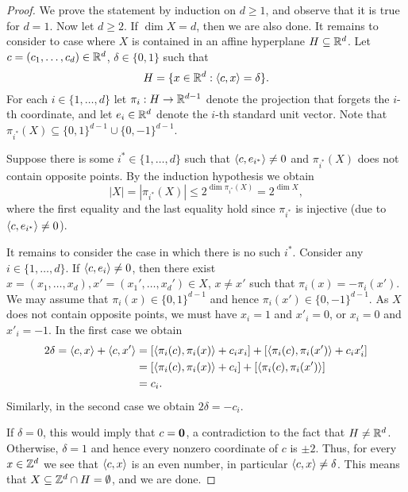 \begin{proof}
    We prove the statement by induction on $d \ge 1$, and observe that it is true for $d = 1$.
    Now let $d \ge 2$.
    If $\dim X = d$, then we are also done.
    It remains to consider to case where $X$ is contained in an affine hyperplane $H \subseteq {\mathbb{R}}^d$.
    Let $c = (c_1,\ldots,c_d) \in {\mathbb{R}}^d$, $\delta \in \{0,1\}$ such that $$H = \{ x \in {\mathbb{R}}^d : \langle c,x\rangle = \delta \}.$$
    For each $i \in \{1,\dots,d\}$ let $\pi_i : H \to {\mathbb{R}}^{d-1}$ denote the projection that forgets the $i$-th coordinate, and let $e_i \in {\mathbb{R}}^d$ denote the $i$-th standard unit vector. Note that $\pi_{i^*}(X) \subseteq \{0,1\}^{d-1} \cup \{0,-1\}^{d-1}$.

    Suppose there is some $i^* \in \{1,\dots,d\}$ such that $\langle c, e_{i^*}\rangle \ne 0$ and $\pi_{i^*}(X)$ does not contain opposite points.
    By the induction hypothesis we obtain
    \[
        |X| = |\pi_{i^*}(X)| \le 2^{\dim \pi_{i^*}(X)} = 2^{\dim X},
    \]
    where the first equality and the last equality hold since $\pi_{i^*}$ is injective (due to $\langle c, e_{i^*}\rangle \ne 0$).

    It remains to consider the case in which there is no such $i^*$.
    Consider any $i \in \{1,\dots,d\}$.
    If $\langle c, e_i \rangle \ne 0$, then there exist $x=(x_1,\ldots,x_d),x'=(x_1',\ldots,x_d') \in X$, $x \ne x'$ such that $\pi_i(x) = -\pi_i(x')$.
    We may assume that $\pi_i(x) \in \{0,1\}^{d-1}$ and hence $\pi_i(x') \in \{0,-1\}^{d-1}$.
    As $X$ does not contain opposite points, we must have $x_i = 1$ and $x'_i = 0$, or $x_i = 0$ and $x'_i = -1$.
    In the first case we obtain
    \begin{align*}
        2 \delta
        = \langle c,x\rangle + \langle c,x'\rangle
        & = [\langle \pi_i(c), \pi_i(x)\rangle + c_ix_i] + [\langle \pi_i(c), \pi_i(x')\rangle + c_ix'_i] \\
        & = [\langle \pi_i(c), \pi_i(x)\rangle + c_i] + [\langle\pi_i(c), \pi_i(x')\rangle] \\
        & = c_i.
    \end{align*}
    Similarly, in the second case we obtain $2 \delta = -c_i$.

    If $\delta = 0$, this would imply that $c = \mathbf{0}$, a contradiction to the fact that $H \ne {\mathbb{R}}^d$.
    Otherwise, $\delta = 1$ and hence every nonzero coordinate of $c$ is $\pm 2$.
    Thus, for every $x \in {\mathbb{Z}}^d$ we see that $\langle c,x\rangle$ is an even number, in particular $\langle c,x\rangle \ne \delta$.
    This means that $X \subseteq {\mathbb{Z}}^d \cap H = \emptyset$, and we are done.
\end{proof}

